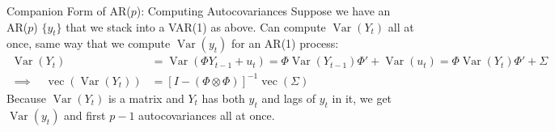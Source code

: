 \documentclass[aspectratio=169, handout]{beamer}
\newcommand{\vc}{\operatorname{vec}}
\newcommand{\Var}{\operatorname{Var}}
\begin{document}
{\footnotesize
\begin{frame}{Companion Form of AR($p$): Computing Autocovariances}
Suppose we have an AR($p$) $\{y_t\}$ that we stack into a VAR(1) as
above.
Can compute $\Var(Y_t)$ all at once, same way that we compute
$\Var(y_t)$ for an AR(1) process:
\begin{align*}
  \Var({Y}_t)
  &=
  \Var(\Phi {Y}_{t-1}+ {u}_t)
  =
  \Phi \Var({Y}_{t-1})\Phi'
  +
  \Var(u_t)
  =
  \Phi \Var({Y}_{t})\Phi'
  +
  \Sigma
  \\
  \implies\quad
  \vc(\Var({Y}_t))
  &=
  [I-(\Phi\otimes\Phi)]^{-1}
  \vc(\Sigma)
\end{align*}
Because $\Var(Y_t)$ is a matrix and $Y_t$ has both $y_t$ and lags of
$y_t$ in it, we get $\Var(y_t)$ and first $p-1$ autocovariances all at
once.
\end{frame}
}
\end{document}
